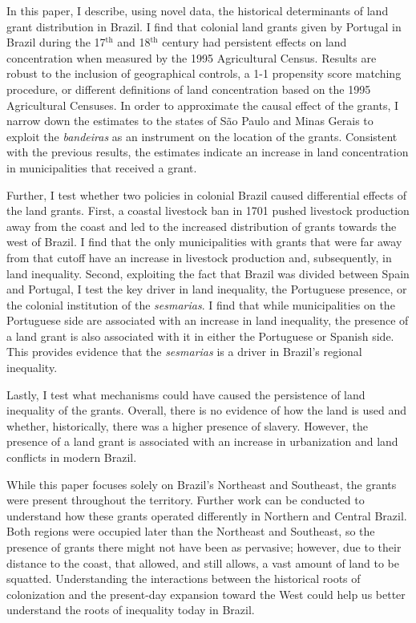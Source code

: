 \documentclass[11pt]{article}
\begin{document}
In this paper, I describe, using novel data, the historical determinants of land grant distribution in Brazil. 
I find that colonial land grants given by Portugal in Brazil during the 17$^\text{th}$ and 18$^\text{th}$ century had persistent effects on land concentration when measured by the 1995 Agricultural Census.
Results are robust to the inclusion of geographical controls, a 1-1 propensity score matching procedure, or different definitions of land concentration based on the 1995 Agricultural Censuses.
In order to approximate the causal effect of the grants, I narrow down the estimates to the states of São Paulo and Minas Gerais to exploit the \textit{bandeiras} as an instrument on the location of the grants. 
Consistent with the previous results, the estimates indicate an increase in land concentration in municipalities that received a grant.

Further, I test whether two policies in colonial Brazil caused differential effects of the land grants. 
First, a coastal livestock ban in 1701 pushed livestock production away from the coast and led to the increased distribution of grants towards the west of Brazil.
I find that the only municipalities with grants that were far away from that cutoff have an increase in livestock production and, subsequently, in land inequality.
Second, exploiting the fact that Brazil was divided between Spain and Portugal, I test the key driver in land inequality, the Portuguese presence, or the colonial institution of the \textit{sesmarias}. 
I find that while municipalities on the Portuguese side are associated with an increase in land inequality, the presence of a land grant is also associated with it in either the Portuguese or Spanish side.
This provides evidence that the \textit{sesmarias} is a driver in Brazil's regional inequality.

Lastly, I test what mechanisms could have caused the persistence of land inequality of the grants.
Overall, there is no evidence of how the land is used and whether, historically, there was a higher presence of slavery.
However, the presence of a land grant is associated with an increase in urbanization and land conflicts in modern Brazil.

While this paper focuses solely on Brazil's Northeast and Southeast, the grants were present throughout the territory.
Further work can be conducted to understand how these grants operated differently in Northern and Central Brazil. 
Both regions were occupied later than the Northeast and Southeast, so the presence of grants there might not have been as pervasive; however, due to their distance to the coast, that allowed, and still allows, a vast amount of land to be squatted. 
Understanding the interactions between the historical roots of colonization and the present-day expansion toward the West could help us better understand the roots of inequality today in Brazil.
\end{document}
